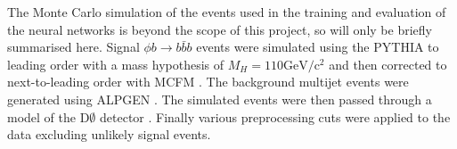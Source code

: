 
The Monte Carlo simulation of the events used in the training and evaluation of the neural networks is beyond the scope of this project, so will only be briefly summarised here. Signal $\phi b \rightarrow b\bar{b}b $ events were simulated using the PYTHIA \cite{sjostrand2006pythia} to leading order with a mass hypothesis  of $M_H = 110 \mathrm{GeV/c^2}$ and then corrected to next-to-leading order with MCFM \cite{campbell2010mcfm}. The background multijet events were generated using ALPGEN \cite{mangano2003alpgen}. The simulated events were then passed through a model of the D$\emptyset$ detector \cite{brun1993geant}. Finally various preprocessing cuts were applied to the data excluding unlikely signal events.
